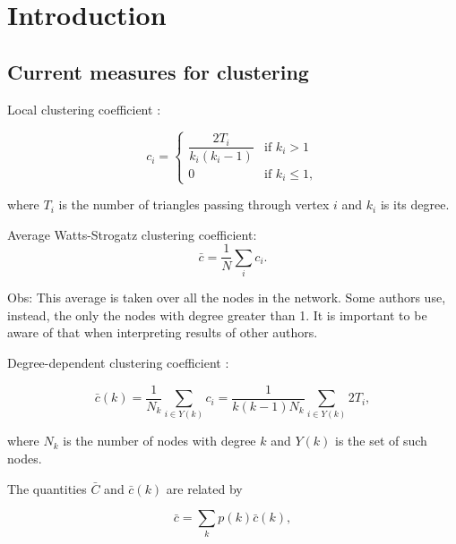 \documentclass{article}
\begin{document}


\section{Introduction}

\subsection{Current measures for clustering}

Local clustering coefficient \cite{Watts1998}:

\begin{equation} \label{eq:Cws}
    c_i = 
    \left\{
    	\begin{array}{ll}
    		\dfrac{2 T_i}{k_i (k_i-1)}  & \mbox{if } k_i > 1 \\
    		0 & \mbox{if } k_i \leq 1,
    	\end{array}
    \right.
\end{equation}

where $T_i$ is the number of triangles passing through vertex $i$ and $k_i$ is its degree.

Average Watts-Strogatz clustering coefficient:
\begin{equation}
    \bar{c} = \dfrac{1}{N} \sum_i c_i.
\end{equation}

Obs: This average is taken over all the nodes in the network. Some authors use, instead, the only the nodes with degree greater than 1. It is important to be aware of that when interpreting results of other authors.

Degree-dependent clustering coefficient \cite{Vazquez2002Large-scaleInternet}:

\begin{equation}
    \bar{c}(k) = \dfrac{1}{N_k} \sum_{i\in Y(k)} c_i = \dfrac{1}{k(k-1)N_k} \sum_{i\in Y(k)} 2T_i,
\end{equation}

where $N_k$ is the number of nodes with degree $k$ and $Y(k)$ is the set of such nodes.

The quantities $\bar{C}$ and $\bar{c}(k)$ are related by

\begin{equation}
    \bar{c} = \sum_k p(k) \bar{c}(k),
\end{equation}
\end{document}
